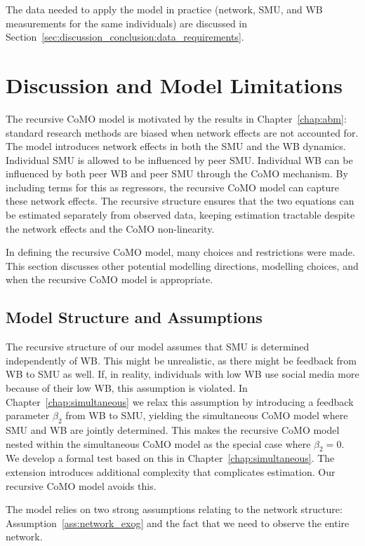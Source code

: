 The data needed to apply the model in practice (network, SMU, and WB measurements for the same individuals) are discussed in Section~\ref{sec:discussion_conclusion:data_requirements}.

\section{Discussion and Model Limitations}
\label{sec:model:discussion}
The recursive CoMO model is motivated by the results in Chapter~\ref{chap:abm}: standard research methods are biased when network effects are not accounted for. The model introduces network effects in both the SMU and the WB dynamics. Individual SMU is allowed to be influenced by peer SMU\@. Individual WB can be influenced by both peer WB and peer SMU through the CoMO mechanism. By including terms for this as regressors, the recursive CoMO model can capture these network effects. The recursive structure ensures that the two equations can be estimated separately from observed data, keeping estimation tractable despite the network effects and the CoMO non-linearity.

In defining the recursive CoMO model, many choices and restrictions were made. This section discusses other potential modelling directions, modelling choices, and when the recursive CoMO model is appropriate.

\subsection{Model Structure and Assumptions}

The recursive structure of our model assumes that SMU is determined independently of WB\@. This might be unrealistic, as there might be feedback from WB to SMU as well. If, in reality, individuals with low WB use social media more because of their low WB, this assumption is violated. In Chapter~\ref{chap:simultaneous} we relax this assumption by introducing a feedback parameter $\beta_2$ from WB to SMU, yielding the simultaneous CoMO model where SMU and WB are jointly determined. This makes the recursive CoMO model nested within the simultaneous CoMO model as the special case where $\beta_2 = 0$. We develop a formal test based on this in Chapter~\ref{chap:simultaneous}. The extension introduces additional complexity that complicates estimation. Our recursive CoMO model avoids this.

The model relies on two strong assumptions relating to the network structure: Assumption~\ref{ass:network_exog} and the fact that we need to observe the entire network.

